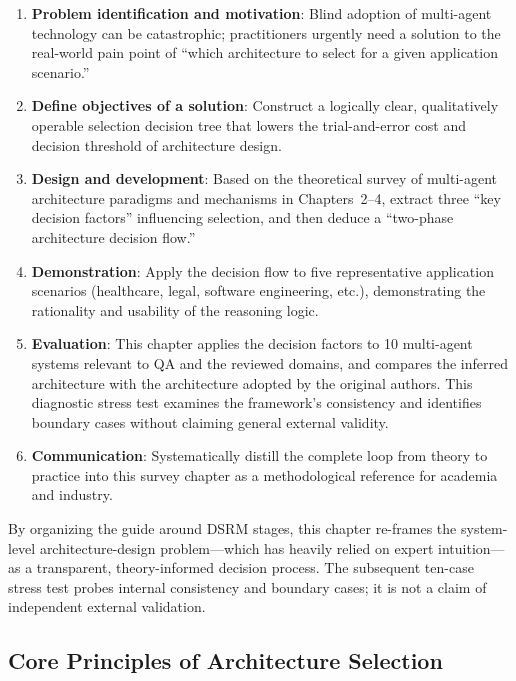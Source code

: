 \begin{enumerate}
  \item \textbf{Problem identification and motivation}: Blind adoption of
    multi-agent technology can be catastrophic; practitioners urgently need
    a solution to the real-world pain point of ``which architecture to select
    for a given application scenario.''
  \item \textbf{Define objectives of a solution}: Construct a logically
    clear, qualitatively operable selection decision tree that lowers the
    trial-and-error cost and decision threshold of architecture design.
  \item \textbf{Design and development}: Based on the theoretical survey of
    multi-agent architecture paradigms and mechanisms in Chapters~2--4,
    extract three ``key decision factors'' influencing selection, and then
    deduce a ``two-phase architecture decision flow.''
  \item \textbf{Demonstration}: Apply the decision flow to five representative
    application scenarios (healthcare, legal, software engineering, etc.),
    demonstrating the rationality and usability of the reasoning logic.
  \item \textbf{Evaluation}: This chapter applies the decision factors to 10
    multi-agent systems relevant to QA and the reviewed domains, and compares the inferred
    architecture with the architecture adopted by the original authors. This
    diagnostic stress test examines the framework's consistency and identifies
    boundary cases without claiming general external validity.
  \item \textbf{Communication}: Systematically distill the complete loop from
    theory to practice into this survey chapter as a methodological reference
    for academia and industry.
\end{enumerate}

By organizing the guide around DSRM stages, this chapter re-frames the
system-level architecture-design problem---which has heavily relied on
expert intuition---as a transparent, theory-informed decision process. The
subsequent ten-case stress test probes internal consistency and boundary cases;
it is not a claim of independent external validation.

\subsection{Core Principles of Architecture Selection}
\label{sec:principles}

